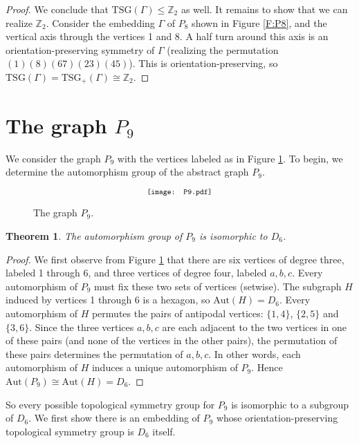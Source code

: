 \documentclass[11]{amsart}
\def\Z{\mathbb{Z}}
\def\TSG{{\mathrm{TSG}}}
\def\Aut{{\mathrm{Aut}}}
\newtheorem{theorem}{Theorem}[section]
\theoremstyle{definition}
\theoremstyle{remark}
\begin{document}
\begin{proof}
We conclude that $\TSG(\Gamma) \leq \Z_2$ as well.  It remains to show that we can realize $\Z_2$.  Consider the embedding $\Gamma$ of $P_8$ shown in Figure \ref{F:P8}, and the vertical axis through the vertices 1 and 8.  A half turn around this axis is an orientation-preserving symmetry of $\Gamma$ (realizing the permutation $(1)(8)(67)(23)(45)$). This is orientation-preserving, so $\TSG(\Gamma) = \TSG_+(\Gamma) \cong \Z_2$.
\end{proof}

\section{The graph $P_9$}\label{S:P9}

We consider the graph $P_9$ with the vertices labeled as in Figure \ref{F:P9}. To begin, we determine the automorphism group of the abstract graph $P_9$.

\begin{figure} [h]
$$\scalebox{.8}{\texttt{[image: P9.pdf]}}$$
\caption{The graph $P_9$.}
\label{F:P9}
\end{figure}

\begin{theorem} \label{T:P9aut}
The automorphism group of $P_9$ is isomorphic to $D_6$.
\end{theorem}
\begin{proof}
We first observe from Figure \ref{F:P9} that there are six vertices of degree three, labeled 1 through 6, and three vertices of degree four, labeled $a, b, c$. Every automorphism of $P_9$ must fix these two sets of vertices (setwise). The subgraph $H$ induced by vertices 1 through 6 is a hexagon, so $\Aut(H) = D_6$.  Every automorphism of $H$ permutes the pairs of antipodal vertices: $\{1,4\}$, $\{2,5\}$ and $\{3,6\}$.  Since the three vertices $a, b, c$ are each adjacent to the two vertices in one of these pairs (and none of the vertices in the other pairs), the permutation of these pairs determines the permutation of $a, b, c$. In other words, each automorphism of $H$ induces a unique automorphism of $P_9$.  Hence $\Aut(P_9) \cong \Aut(H) = D_6$.
\end{proof}

So every possible topological symmetry group for $P_9$ is isomorphic to a subgroup of $D_6$. We first show there is an embedding of $P_9$ whose orientation-preserving topological symmetry group is $D_6$ itself.
\end{document}
